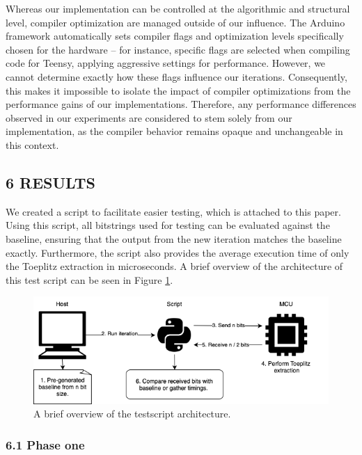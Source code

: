 Whereas our implementation can be controlled at the algorithmic and structural level, compiler optimization are managed outside of our influence. The Arduino framework automatically sets compiler flags and optimization levels specifically chosen for the hardware -- for instance, specific flags are selected when compiling code for Teensy, applying aggressive settings for performance. However, we cannot determine exactly how these flags influence our iterations. Consequently, this makes it impossible to isolate the impact of compiler optimizations from the performance gains of our implementations. Therefore, any performance differences observed in our experiments are considered to stem solely from our implementation, as the compiler behavior remains opaque and unchangeable in this context.

\subsection{6 RESULTS}\label{results}

We created a script to facilitate easier testing, which is attached to this paper. Using this script, all bitstrings used for testing can be evaluated against the baseline, ensuring that the output from the new iteration matches the baseline exactly. Furthermore, the script also provides the average execution time of only the Toeplitz extraction in microseconds. A brief overview of the architecture of this test script can be seen in Figure \ref{fig:testscript-architecture}.

\begin{figure}[!t] \centering
\includegraphics[width=\textwidth]{img/testscript.png} \caption{A brief overview
of the testscript architecture.} \label{fig:testscript-architecture}
\end{figure}

\subsubsection{6.1 Phase one}\label{phase-one-1}

